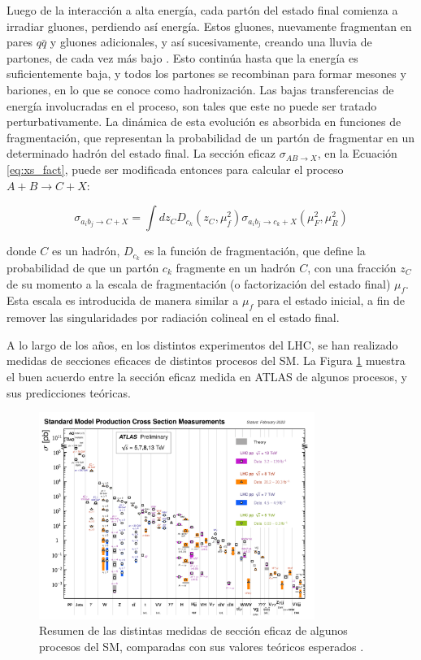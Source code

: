 Luego de la interacción a alta energía, cada partón del estado final comienza a irradiar gluones,
perdiendo así energía. Estos gluones, nuevamente fragmentan en pares $q\bar{q}$ y gluones adicionales, y así sucesivamente, creando una lluvia de partones, de cada vez más bajo \pt. Esto continúa hasta
que la energía es suficientemente baja, y todos los partones se recombinan para formar
mesones y bariones, en lo que se conoce como hadronización. Las bajas transferencias de
energía involucradas en el proceso, son tales que este no puede ser tratado perturbativamente. La dinámica de esta evolución es absorbida en funciones de fragmentación, que
representan la probabilidad de un partón de fragmentar en un determinado hadrón del
estado final. La sección eficaz $\sigma_{AB\to X}$, en la Ecuación \ref{eq:xs_fact}, puede ser modificada entonces para
calcular el proceso $A + B \to C + X$:

\begin{equation}
	\sigma_{a_i b_j \to C+X} = \int dz_{C} D_{c_k}(z_C, \mu_{f}^2) \sigma_{a_i b_j \to c_k + X}(\mu_{F}^2, \mu_{R}^2)
\end{equation}

\noindent
donde $C$ es un hadrón, $D_{c_k}$ es la función de fragmentación, que define la probabilidad
de que un partón $c_k$ fragmente en un hadrón $C$, con una fracción $z_C$ de su momento a la
escala de fragmentación (o factorización del estado final) $\mu_{f}$. Esta escala es introducida
de manera similar a $\mu_{f}$ para el estado inicial, a fin de remover las singularidades por
radiación colineal en el estado final.

A lo largo de los años, en los distintos experimentos del LHC, se han realizado medidas de secciones eficaces de distintos procesos del SM. La Figura \ref{fig:sm_xs} muestra el buen acuerdo entre la sección eficaz medida en ATLAS de algunos procesos, y sus predicciones teóricas.

\begin{figure}
	\centering
  \includegraphics[width=0.8\textwidth]{images/theory/ATLAS_a_SMSummary_TotalXsect_3.pdf}
  \caption{Resumen de las distintas medidas de sección eficaz de algunos procesos del SM, comparadas con sus valores teóricos esperados \cite{sm_xs}.}
  \label{fig:sm_xs}
\end{figure}







